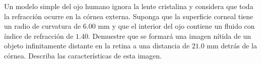 \item Un modelo simple del ojo humano ignora la lente cristalina y considera que toda la refracción ocurre en la córnea externa. Suponga que la superficie corneal tiene un radio de curvatura de $6.00\text{ mm}$ y que el interior del ojo contiene un fluido con índice de refracción de $1.40$. Demuestre que se formará una imagen nítida de un objeto infinitamente distante en la retina a una distancia de $21.0\text{ mm}$ detrás de la córnea. Describa las características de esta imagen.